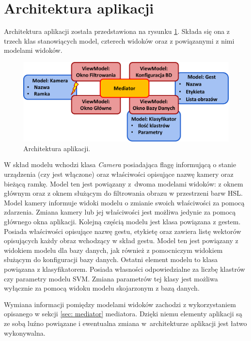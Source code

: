 \section{Architektura aplikacji}
Architektura aplikacji została przedstawiona na rysunku \ref{im: AppArchitectureWithHsl}. Składa się ona z trzech klas stanowiących model, czterech widoków oraz z powiązanymi z nimi modelami widoków. 

\begin{figure}[h!]
	\centering
	\includegraphics[width=16cm]{ArchitectureMediator}
	\centering
	\caption{Architektura aplikacji.}
	\label{im: AppArchitectureWithHsl}
\end{figure}

W skład modelu wchodzi klasa \textit{Camera} posiadająca flagę informującą o stanie urządzenia (czy jest włączone) oraz właściwości opisujące nazwę kamery oraz bieżącą ramkę. Model ten jest powiązany z~dwoma modelami widoków: z oknem głównym oraz z oknem służącym do filtrowania obrazu w przestrzeni barw HSL. Model kamery informuje widoki modelu o zmianie swoich właściwości za pomocą zdarzenia. Zmiana kamery lub jej właściwości jest możliwa jedynie za pomocą głównego okna aplikacji. Kolejną częścią modelu jest klasa powiązana z gestem. Posiada właściwości opisujące nazwę gestu, etykietę oraz zawiera listę wektorów opisujących każdy obraz wchodzący w skład gestu. Model ten jest powiązany z widokiem modelu dla bazy danych, jak również z pomocniczym widokiem służącym do konfiguracji bazy danych. Ostatni element modelu to klasa powiązana z klasyfikatorem. Posiada własności odpowiedzialne za liczbę klastrów czy parametry modelu SVM. Zmiana parametrów tej klasy jest możliwa wyłącznie za pomocą widoku modelu skojarzonym z bazą danych.

Wymiana informacji pomiędzy modelami widoków zachodzi z wykorzystaniem opisanego w sekcji \ref{sec: mediator} mediatora. Dzięki niemu elementy aplikacji są ze sobą luźno powiązane i ewentualna zmiana w~architekturze aplikacji jest łatwo wykonywalna. 

